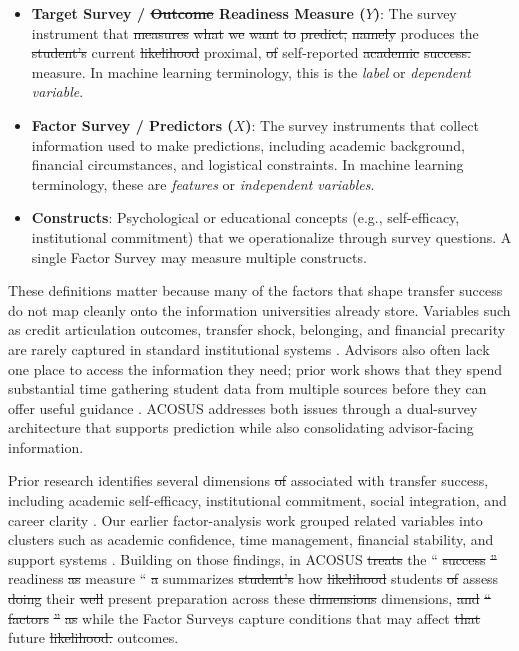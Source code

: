\documentclass[letterpaper,11pt]{article}
\newcommand{\DIFdel}[1]{%
  \begingroup\setlength{\fboxsep}{0.5pt}%
  \colorbox{diffdelbg}{\textcolor{diffdeltext}{\sout{#1}}}%
  \endgroup}
\newcommand{\DIFadd}[1]{%
  \begingroup\setlength{\fboxsep}{0.5pt}%
  \colorbox{diffaddbg}{\textcolor{diffaddtext}{#1}}%
  \endgroup}
\begin{document}
\begin{itemize}
    \item \textbf{Target Survey / \DIFdel{Outcome} \DIFadd{Readiness} \DIFadd{Measure} ($Y$)}: The survey instrument that \DIFdel{measures} \DIFdel{what} \DIFdel{we} \DIFdel{want} \DIFdel{to} \DIFdel{predict,} \DIFdel{namely} \DIFadd{produces} the \DIFdel{student's} \DIFadd{current} \DIFdel{likelihood} \DIFadd{proximal,} \DIFdel{of} \DIFadd{self-reported} \DIFdel{academic} \DIFdel{success.} \DIFadd{measure.} In machine learning terminology, this is the \emph{label} or \emph{dependent variable}.
    \item \textbf{Factor Survey / Predictors ($X$)}: The survey instruments that collect information used to make predictions, including academic background, financial circumstances, and logistical constraints. In machine learning terminology, these are \emph{features} or \emph{independent variables}.
    \item \textbf{Constructs}: Psychological or educational concepts (e.g., self-efficacy, institutional commitment) that we operationalize through survey questions. A single Factor Survey may measure multiple constructs.
\end{itemize}

These definitions matter because many of the factors that shape transfer success do not map cleanly onto the information universities already store. Variables such as credit articulation outcomes, transfer shock, belonging, and financial precarity are rarely captured in standard institutional systems \parencite{nguyen2025school}. Advisors also often lack one place to access the information they need; prior work shows that they spend substantial time gathering student data from multiple sources before they can offer useful guidance \parencite{preposttransfer2014}. ACOSUS addresses both issues through a dual-survey architecture that supports prediction while also consolidating advisor-facing information.

Prior research identifies several dimensions \DIFdel{of} \DIFadd{associated} \DIFadd{with} transfer success, including academic self-efficacy, institutional commitment, social integration, and career clarity \parencite{factoranalysis2023}. Our earlier factor-analysis work grouped related variables into clusters such as academic confidence, time management, financial stability, and support systems \parencite{factoranalysis2023}. Building on those findings, \DIFadd{in} ACOSUS \DIFdel{treats} \DIFadd{the} ``\DIFdel{success}\DIFdel{''} \DIFadd{readiness} \DIFdel{as} \DIFadd{measure}\DIFadd{``} \DIFdel{a} \DIFadd{summarizes} \DIFdel{student's} \DIFadd{how} \DIFdel{likelihood} \DIFadd{students} \DIFdel{of} \DIFadd{assess} \DIFdel{doing} \DIFadd{their} \DIFdel{well} \DIFadd{present} \DIFadd{preparation} across these \DIFdel{dimensions} \DIFadd{dimensions,} \DIFdel{and} \DIFdel{``}\DIFdel{factors}\DIFdel{''} \DIFdel{as} \DIFadd{while} the \DIFadd{Factor} \DIFadd{Surveys} \DIFadd{capture} conditions that \DIFadd{may} affect \DIFdel{that} \DIFadd{future} \DIFdel{likelihood.} \DIFadd{outcomes.}
\end{document}
